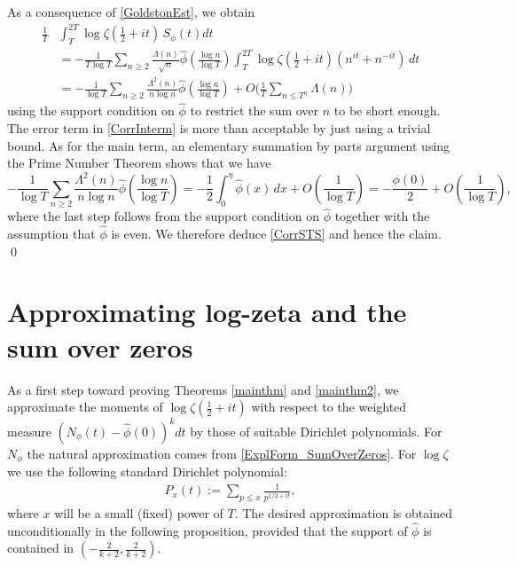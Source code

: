 \documentclass[12pt,oneside,english,a4paper]{amsart}
\theoremstyle{remark}
\numberwithin{equation}{section}
\begin{document}
    As a consequence of \eqref{GoldstonEst}, we obtain
    \begin{equation}\label{CorrInterm}
        \begin{split}
            \frac{1}{T}&\int_{T}^{2T} \log \zeta(\tfrac{1}{2}+it) \, S_\phi(t) dt \\ &= -\frac{1}{T \log T} \sum_{n \ge 2} \frac{\Lambda(n)}{\sqrt{n}} \hat \phi \left( \frac{\log n}{\log T} \right) \int_{T}^{2 T} \log \zeta(\tfrac{1}{2}+it) \left( n^{i t} + n^{-i t} \right) \, dt \\
            &= -\frac{1}{\log T} \sum_{n \ge 2} \frac{\Lambda^2(n)}{n \log n} \hat \phi \left( \frac{\log n}{\log T} \right) + O \bigg( \frac{1}{T} \sum_{n \le T^{\eta}} \Lambda(n) \bigg)
        \end{split}
    \end{equation}
    using the support condition on $\hat \phi$ to restrict the sum over $n$ to be short enough. The error term in \eqref{CorrInterm} is more than acceptable by just using a trivial bound. As for the main term, an elementary summation by parts argument using the Prime Number Theorem shows that we have
    \[ -\frac{1}{\log T} \sum_{n \ge 2} \frac{\Lambda^2(n)}{n \log n} \hat \phi \left( \frac{\log n}{\log T} \right) = - \frac{1}{2} \int_0^{\eta} \hat \phi(x) \, dx + O \left( \frac{1}{\log T} \right) = - \frac{\phi(0)}{2} + O \left( \frac{1}{\log T} \right), \]
    where the last step follows from the support condition on $\hat \phi$ together with the assumption that $\hat \phi$ is even. We therefore deduce \eqref{CorrSTS} and hence the claim. 
\qed










\section{Approximating log-zeta and the sum over zeros}\label{SectionApproximations}
As a first step toward proving Theorems \ref{mainthm} and \ref{mainthm2}, we approximate the moments of $\log\zeta(\frac{1}{2}+it)$ with respect to the weighted measure $(N_\phi(t)-\hat\phi(0))^kdt$ by those of suitable Dirichlet polynomials.
For $N_\phi$ the natural approximation comes from \cref{ExplForm_SumOverZeros}. For $\log\zeta$ we use the following standard Dirichlet polynomial:
\begin{align}\label{4june.1}
P_x(t) := \sum_{p\leq x} \frac{1}{p^{1/2+it}},
\end{align}
where $x$ will be a small (fixed) power of $T$.
The desired approximation is obtained unconditionally in the following proposition, provided that the support of $\hat\phi$ is contained in $(-\tfrac{2}{k+2},\tfrac{2}{k+2})$. 
\end{document}
